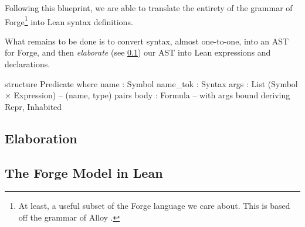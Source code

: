 Following this blueprint, we are able to translate the entirety of the grammar of Forge\footnote{At least, a useful subset of the Forge language we care about. This is based off the grammar of Alloy \cite{jackson2012software,jackson2019alloy,ngpdbccdlrrvwwk-oopsla-2024}.} into Lean syntax definitions.

What remains to be done is to convert syntax, almost one-to-one, into an AST for Forge, and then \emph{elaborate} (see \cref{sec:elaboration}) our AST into Lean expressions and declarations.

\begin{leanimpl}
structure Predicate where
  name : Symbol
  name_tok : Syntax
  args : List (Symbol × Expression) -- (name, type) pairs
  body : Formula -- with args bound
  deriving Repr, Inhabited   
\end{leanimpl}

\subsection{Elaboration}\label{sec:elaboration}

\subsection{The Forge Model in Lean}\label{sec:forge-model}

